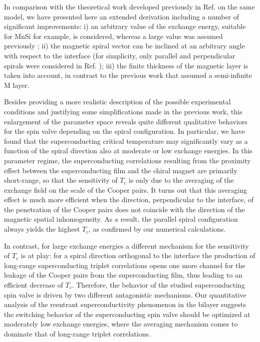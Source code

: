 \documentclass[prb,amsmath,amssymb,reprint]{revtex4-2}
\begin{document}
In comparison with the theoretical work developed previously in Ref.  on the same model, we have presented here an
extended derivation including a number of significant improvements: i) an arbitrary
value of the exchange energy, suitable for MnSi for example, is considered, whereas a large  value was assumed previously \cite{Pugach2017}; ii) the magnetic spiral vector can be inclined at an arbitrary angle with respect to the interface (for simplicity, only parallel and perpendicular spirals were considered in Ref. ); iii) the finite thickness of the magnetic layer is taken into account, in contrast to the previous work \cite{Pugach2017} that assumed a semi-infinite M layer.


Besides providing a more realistic description of the possible experimental conditions and justifying some simplifications made in the previous work, this enlargement of the parameter space reveals quite different qualitative behaviors for the spin valve depending on the spiral configuration. In particular, we have found that the superconducting critical temperature may significantly vary as a function of the spiral direction also at moderate or low exchange energies. In this parameter regime, the superconducting correlations resulting from the proximity effect between the superconducting film and the chiral magnet are primarily short-range, so that the sensitivity of $T_c$ is only due to
the averaging of the exchange field on the scale of the Cooper pairs. It turns out that this averaging effect is much more efficient when the direction, perpendicular to the interface, of the penetration of the Cooper pairs  does not coincide with the direction of the magnetic spatial inhomogeneity. As a result, the parallel spiral configuration always yields the highest $T_c$, as confirmed by our numerical calculations.

In contrast, for large exchange energies a different mechanism for the sensitivity of $T_c$ is at play: for a spiral direction orthogonal to the interface the production of long-range superconducting triplet correlations opens one more channel for the leakage of the Cooper pairs from the superconducting film, thus leading to an efficient decrease of $T_c$.
Therefore, the behavior of the studied superconducting spin valve is driven by two different antagonistic mechanisms. Our quantitative analysis of the reentrant superconductivity phenomenon in the bilayer suggests the switching behavior of the superconducting spin valve should be optimized  at moderately low exchange energies, where the averaging mechanism comes to dominate that of  long-range triplet correlations.
\end{document}
